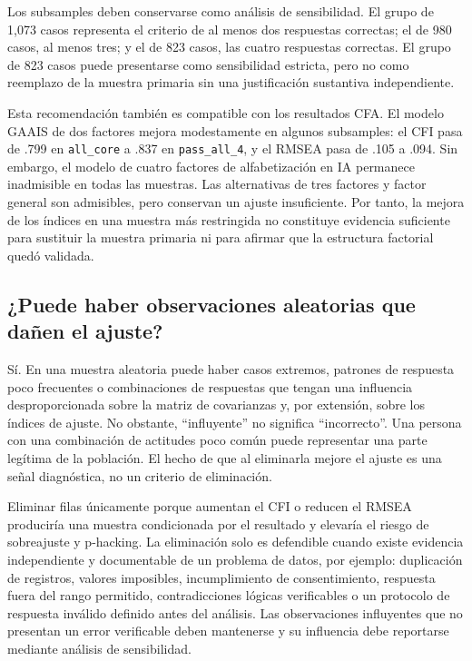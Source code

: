 \documentclass[11pt,a4paper]{article}
\begin{document}
Los subsamples deben conservarse como análisis de sensibilidad. El grupo de 1,073 casos representa el criterio de al menos dos respuestas correctas; el de 980 casos, al menos tres; y el de 823 casos, las cuatro respuestas correctas. El grupo de 823 casos puede presentarse como sensibilidad estricta, pero no como reemplazo de la muestra primaria sin una justificación sustantiva independiente.

Esta recomendación también es compatible con los resultados CFA. El modelo GAAIS de dos factores mejora modestamente en algunos subsamples: el CFI pasa de .799 en \texttt{all\_core} a .837 en \texttt{pass\_all\_4}, y el RMSEA pasa de .105 a .094. Sin embargo, el modelo de cuatro factores de alfabetización en IA permanece inadmisible en todas las muestras. Las alternativas de tres factores y factor general son admisibles, pero conservan un ajuste insuficiente. Por tanto, la mejora de los índices en una muestra más restringida no constituye evidencia suficiente para sustituir la muestra primaria ni para afirmar que la estructura factorial quedó validada.

\subsection{¿Puede haber observaciones aleatorias que dañen el ajuste?}

Sí. En una muestra aleatoria puede haber casos extremos, patrones de respuesta poco frecuentes o combinaciones de respuestas que tengan una influencia desproporcionada sobre la matriz de covarianzas y, por extensión, sobre los índices de ajuste. No obstante, ``influyente'' no significa ``incorrecto''. Una persona con una combinación de actitudes poco común puede representar una parte legítima de la población. El hecho de que al eliminarla mejore el ajuste es una señal diagnóstica, no un criterio de eliminación.

Eliminar filas únicamente porque aumentan el CFI o reducen el RMSEA produciría una muestra condicionada por el resultado y elevaría el riesgo de sobreajuste y p-hacking. La eliminación solo es defendible cuando existe evidencia independiente y documentable de un problema de datos, por ejemplo: duplicación de registros, valores imposibles, incumplimiento de consentimiento, respuesta fuera del rango permitido, contradicciones lógicas verificables o un protocolo de respuesta inválido definido antes del análisis. Las observaciones influyentes que no presentan un error verificable deben mantenerse y su influencia debe reportarse mediante análisis de sensibilidad.
\end{document}
